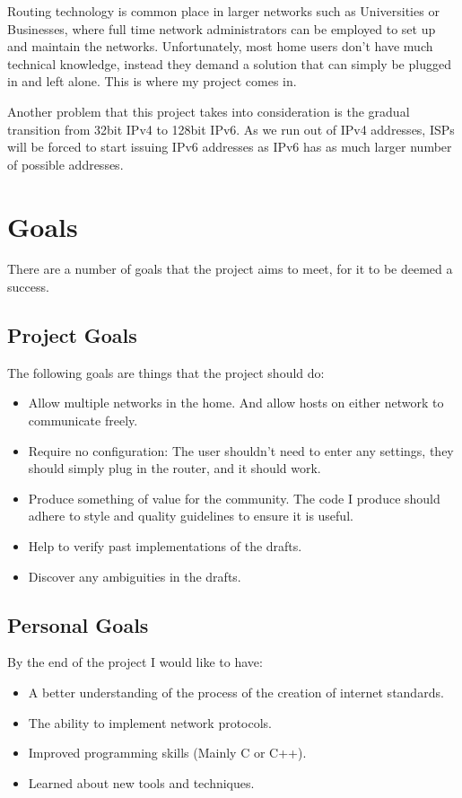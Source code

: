 \documentclass[12pt]{report}
\begin{document}
Routing technology is common place in larger networks such as Universities or
Businesses, where full time network administrators can be employed to set up and
maintain the networks. Unfortunately, most home users don't have much technical
knowledge, instead they demand a solution that can simply be plugged in and left
alone. This is where my project comes in. 

Another problem that this project takes into consideration is the gradual
transition from 32bit IPv4 to 128bit IPv6. As we
run out of IPv4 addresses, ISPs will be forced to start issuing IPv6 addresses
as IPv6 has as much larger number of possible addresses.

\section{Goals}
There are a number of goals that the project aims to meet, for it to be deemed
a success.

\subsection{Project Goals }
The following goals are things that the project should do:

\begin{itemize}
	\item Allow multiple networks in the home. And allow hosts on either
	network to communicate freely. 
	\item Require no configuration: The user shouldn't need to enter any 
	settings, they should simply plug in the router, and it should  work.
	\item Produce something of value for the community. The code I produce  
	should adhere to style and quality guidelines to ensure it is useful.
	\item Help to verify past implementations of the drafts.
	\item Discover any ambiguities in the drafts.
\end{itemize}

\subsection{Personal Goals}
By the end of the project I would like to have:

\begin{itemize}
	\item A better understanding of the process of the creation of internet
	standards.
	\item The ability to implement network protocols. 
	\item Improved programming skills (Mainly C or C++).
	\item Learned about new tools and techniques.
\end{itemize}
\end{document}
